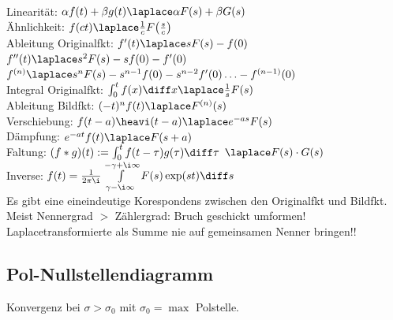 \documentclass[6pt,a4paper]{scrartcl}
\begin{document}
\begin{multicols}{4}
\begin{tabular}{rl|rl}
	\end{tabular}\\
	\everymath{\textstyle}
	Linearität: $\alpha f(t) + \beta g(t) \laplace \alpha F(s) + \beta G(s)$\\
	Ähnlichkeit: $f(ct) \laplace \frac{1}{c} F\bigl(  \frac{s}{c} \bigr)$\\
	Ableitung Originalfkt: $f'(t) \laplace s F(s) - f(0)$ \quad $f''(t) \laplace s^2 F(s) - sf(0) - f'(0)$\\
	$f^{(n)} \laplace s^n F(s) - s^{n-1} f(0) - s^{n-2} f'(0) \ldots - f^{(n-1)}(0)$\\
	Integral Originalfkt: $\int_0^t f(x) \diff x \laplace \frac{1}{s} F(s)$\\
	Ableitung Bildfkt: $(-t)^n f(t) \laplace F^{(n)} (s)$\\
	Verschiebung: $f(t-a)\heavi(t-a) \laplace e^{-as} F(s)$\\
	Dämpfung: $e^{-at} f(t) \laplace F(s+a)$\\
	Faltung: $(f * g)(t) := \int_0^t f( t - \tau) g(\tau) \diff \tau$ $\laplace F(s) \cdot G(s)$\\
	Inverse: $f(t) = \frac{1}{2\pi \i} \int\limits_{\gamma - \i \infty}^{-\gamma + \i \infty} F(s) \exp(st) \diff s$\\
	Es gibt eine eineindeutige Korespondens zwischen den Originalfkt und Bildfkt.
	Meist Nennergrad $>$ Zählergrad: Bruch geschickt umformen!
	Laplacetransformierte als Summe nie auf gemeinsamen Nenner bringen!!


	\subsection{Pol-Nullstellendiagramm}
	Konvergenz bei $\sigma > \sigma_0$ mit $\sigma_0 = \max$ Polstelle.\\

\end{multicols}

\end{document}

